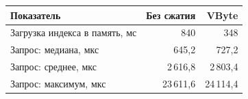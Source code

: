 \begin{tabular}{|p{}|r|r|}
\hline
Показатель & Без сжатия & VByte \\
\hline
Загрузка индекса в память, мс & 840 & 348 \\
\hline
Запрос: медиана, мкс & 645,2 & 727,2 \\
\hline
Запрос: среднее, мкс & 2\,616,8 & 2\,803,4 \\
\hline
Запрос: максимум, мкс & 23\,611,6 & 24\,114,4 \\
\hline
\end{tabular}

